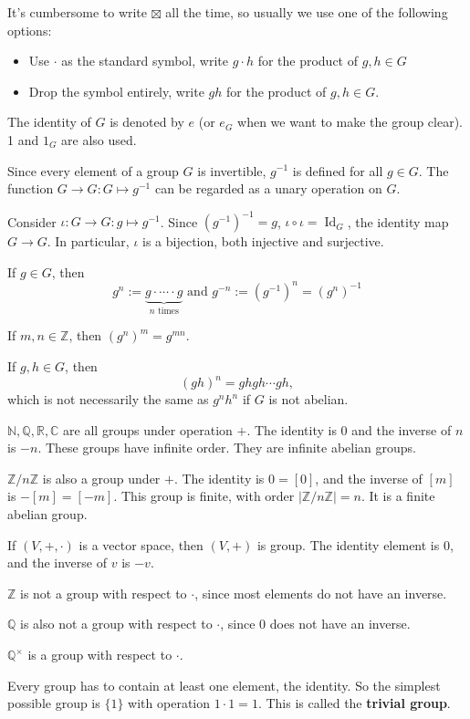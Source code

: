 It's cumbersome to write $\boxtimes$ all the time, so usually we use one of the following options:
\begin{itemize}
	\item Use $\cdot$ as the standard symbol, write $g\cdot h$ for the product of $g,h\in G$
	\item Drop the symbol entirely, write $gh$ for the product of $g,h\in G$.
\end{itemize}

The identity of $G$ is denoted by $e$ (or $e_G$ when we want to make the group clear). 1 and $1_G$ are also used.

Since every element of a group $G$ is invertible, $g^{-1}$ is defined for all $g\in G$. The function $G\to G: G\mapsto g^{-1}$ can be regarded as a unary operation on $G$.

Consider $\iota: G\to G: g\mapsto g^{-1}$. Since $(g^{-1})^{-1}=g$, $\iota \circ \iota = \operatorname{Id}_G$, the identity map $G\to G$. In particular, $\iota$ is a bijection, both injective and surjective.

If $g\in G$, then
$$
g^n:= \underbrace{g \cdot \cdots \cdot g}_{n \text{ times}} \text{ and } g^{-n}:= (g^{-1})^n = (g^n)^{-1}
$$
\begin{exercise}
If $m,n\in \mathbb Z$, then $(g^n)^m = g^{mn}$.
\end{exercise}

If $g,h\in G$, then 
$$(gh)^n = ghgh \cdots gh,$$
which is not necessarily the same as $g^nh^n$ if $G$ is not abelian.

\begin{ex}[Groups]
$\mathbb{N,Q,R,C}$ are all groups under operation $+$. The identity is $0$ and the inverse of $n$ is $-n$. These groups have infinite order. They are infinite abelian groups.

$\mathbb Z/n\mathbb Z$ is also a group under $+$. The identity is $0=[0]$, and the inverse of $[m]$ is $-[m]=[-m]$. This group is finite, with order $|\mathbb Z/n\mathbb Z|=n$. It is a finite abelian group.

If $(V,+,\cdot)$ is a vector space, then $(V,+)$ is group. The identity element is $0$, and the inverse of $v$ is $-v$.
\end{ex}

\begin{ex}
$\mathbb{Z}$ is not a group with respect to $\cdot$, since most elements do not have an inverse.

$\mathbb Q$ is also not a group with respect to $\cdot$, since 0 does not have an inverse.

$\mathbb Q^\times$ is a group with respect to $\cdot$.

Every group has to contain at least one element, the identity. So the simplest possible group is $\{1\}$ with operation $1\cdot 1=1$. This is called the \textbf{trivial group}.
\end{ex}

